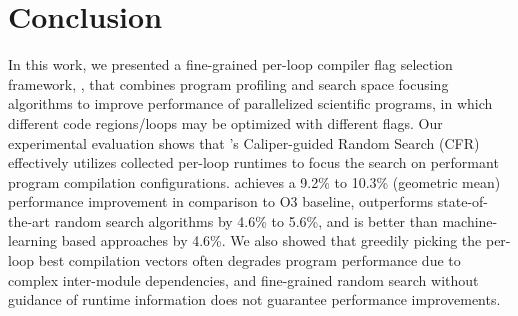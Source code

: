 \section{Conclusion} \label{conclusion}

In this work, we presented a fine-grained per-loop compiler flag
selection framework, \toolname, that combines program profiling and
search space focusing algorithms to improve performance of parallelized
scientific programs, in which different code regions/loops may be optimized
with different flags.  Our experimental evaluation shows that
\toolname's Caliper-guided Random Search (CFR) effectively utilizes
collected per-loop runtimes to focus the search on performant program
compilation configurations.
\toolname achieves a 9.2\% to 10.3\% (geometric mean) performance improvement
in comparison to O3 baseline, outperforms state-of-the-art random search
algorithms by 4.6\% to 5.6\%, and is better than machine-learning based approaches by 4.6\%.
We also showed that greedily picking the per-loop best compilation vectors often
degrades program performance due to complex inter-module dependencies, and
fine-grained random search without guidance of runtime information does not
guarantee performance improvements.
